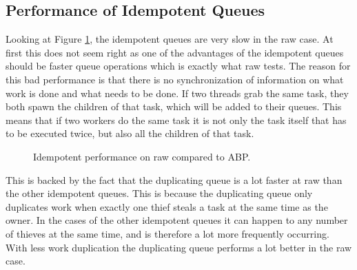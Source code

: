 \subsection{Performance of Idempotent Queues}
Looking at Figure \ref{fig:idemraw}, the idempotent queues are very slow in the raw case. At first this does not seem right as one of the advantages of the idempotent queues should be faster queue operations which is exactly what raw tests. The reason for this bad performance is that there is no synchronization of information on what work is done and what needs to be done. If two threads grab the same task, they both spawn the children of that task, which will be added to their queues. This means that if two workers do the same task it is not only the task itself that has to be executed twice, but also all the children of that task.

\begin{figure}
\caption{Idempotent performance on raw compared to ABP.}
\label{fig:idemraw}
\end{figure}

This is backed by the fact that the duplicating queue is a lot faster at raw than the other idempotent queues. This is because the duplicating queue only duplicates work when exactly one thief steals a task at the same time as the owner. In the cases of the other idempotent queues it can happen to any number of thieves at the same time, and is therefore a lot more frequently occurring. With less work duplication the duplicating queue performs a lot better in the raw case.